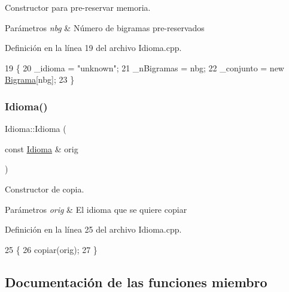 Constructor para pre-\/reservar memoria. 


\begin{DoxyParams}{Parámetros}
{\em nbg} & Número de bigramas pre-\/reservados \\
\hline
\end{DoxyParams}


Definición en la línea 19 del archivo Idioma.\+cpp.


\begin{DoxyCode}
19                       \{
20     \_idioma = \textcolor{stringliteral}{"unknown"};
21     \_nBigramas = nbg;
22     \_conjunto = \textcolor{keyword}{new} \hyperlink{classBigrama}{Bigrama}[nbg];
23 \}
\end{DoxyCode}
\mbox{\label{classIdioma_acddd7589175d95fc58101ca4fdbf3679}} 
\subsubsection{\texorpdfstring{Idioma()}{Idioma()}\hspace{0.1cm}{\footnotesize\ttfamily [2/2]}}
{\footnotesize\ttfamily Idioma\+::\+Idioma (\begin{DoxyParamCaption}\item[{const \hyperlink{classIdioma}{Idioma} \&}]{orig }\end{DoxyParamCaption})}



Constructor de copia. 


\begin{DoxyParams}{Parámetros}
{\em orig} & El idioma que se quiere copiar \\
\hline
\end{DoxyParams}


Definición en la línea 25 del archivo Idioma.\+cpp.


\begin{DoxyCode}
25                                  \{
26     copiar(orig);
27 \}
\end{DoxyCode}


\subsection{Documentación de las funciones miembro}
\mbox{\label{classIdioma_af43adb93961472c23da23d841c198c1a}} 

